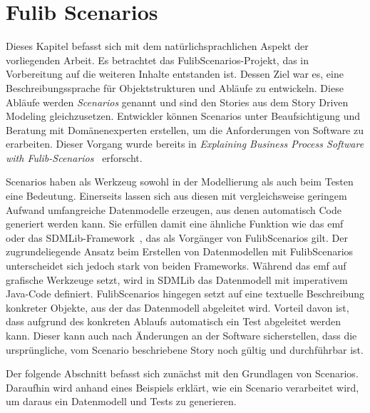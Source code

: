 \chapter{Fulib Scenarios}\label{ch:fulib-scenarios}

Dieses Kapitel befasst sich mit dem natürlichsprachlichen Aspekt der vorliegenden Arbeit.
Es betrachtet das FulibScenarios-Projekt, das in Vorbereitung auf die weiteren Inhalte entstanden ist.
Dessen Ziel war es, eine Beschreibungssprache für Objektstrukturen und Abläufe zu entwickeln.
Diese Abläufe werden \emph{Scenarios} genannt und sind den Stories aus dem Story Driven Modeling gleichzusetzen.
Entwickler können Scenarios unter Beaufsichtigung und Beratung mit Domänenexperten erstellen, um die Anforderungen von Software zu erarbeiten.
Dieser Vorgang wurde bereits in \textit{Explaining Business Process Software with Fulib-Scenarios}~\cite{explain} erforscht.

Scenarios haben als Werkzeug sowohl in der Modellierung als auch beim Testen eine Bedeutung.
Einerseits lassen sich aus diesen mit vergleichsweise geringem Aufwand umfangreiche Datenmodelle erzeugen, aus denen automatisch Code generiert werden kann.
Sie erfüllen damit eine ähnliche Funktion wie das \ac{emf}~\cite{emf} oder das SDMLib-Framework~\cite{networkparser}, das als Vorgänger von FulibScenarios gilt.
Der zugrundeliegende Ansatz beim Erstellen von Datenmodellen mit FulibScenarios unterscheidet sich jedoch stark von beiden Frameworks.
Während das \ac{emf} auf grafische Werkzeuge setzt, wird in SDMLib das Datenmodell mit imperativem Java-Code definiert.
FulibScenarios hingegen setzt auf eine textuelle Beschreibung konkreter Objekte, aus der das Datenmodell abgeleitet wird.
Vorteil davon ist, dass aufgrund des konkreten Ablaufs automatisch ein Test abgeleitet werden kann.
Dieser kann auch nach Änderungen an der Software sicherstellen, dass die ursprüngliche, vom Scenario beschriebene Story noch gültig und durchführbar ist.

Der folgende Abschnitt befasst sich zunächst mit den Grundlagen von Scenarios.
Daraufhin wird anhand eines Beispiels erklärt, wie ein Scenario verarbeitet wird, um daraus ein Datenmodell und Tests zu generieren.



